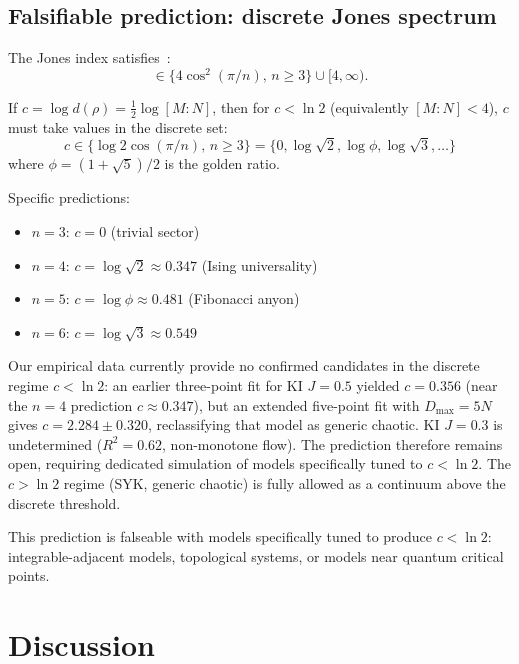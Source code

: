 \documentclass[aps,prl,twocolumn,superscriptaddress,showpacs]{revtex4-2}
\begin{document}
\subsection{Falsifiable prediction: discrete Jones spectrum}

The Jones index satisfies~\cite{Jones1983,LongoRehren1989}:
\begin{equation}
[M:N] \in \{4\cos^2(\pi/n),\, n \geq 3\} \cup [4, \infty).
\label{eq:jones_spectrum}
\end{equation}

If $c = \log d(\rho) = \frac{1}{2}\log[M:N]$, then for $c < \ln 2$
(equivalently $[M:N] < 4$), $c$ must take values in the discrete set:
\begin{equation}
c \in \{\log 2\cos(\pi/n),\, n \geq 3\}
= \{0, \log\sqrt{2}, \log\phi, \log\sqrt{3}, \ldots\}
\label{eq:discrete_prediction}
\end{equation}
where $\phi = (1+\sqrt{5})/2$ is the golden ratio.

Specific predictions:
\begin{itemize}
\item $n=3$: $c = 0$ (trivial sector)
\item $n=4$: $c = \log\sqrt{2} \approx 0.347$ (Ising universality)
\item $n=5$: $c = \log\phi \approx 0.481$ (Fibonacci anyon)
\item $n=6$: $c = \log\sqrt{3} \approx 0.549$
\end{itemize}

Our empirical data currently provide no confirmed candidates in the discrete
regime $c < \ln 2$: an earlier three-point fit for KI $J=0.5$ yielded
$c = 0.356$ (near the $n=4$ prediction $c \approx 0.347$), but an extended
five-point fit with $D_\mathrm{max} = 5N$ gives $c = 2.284 \pm 0.320$,
reclassifying that model as generic chaotic. KI $J=0.3$ is undetermined
($R^2 = 0.62$, non-monotone flow). The prediction therefore remains open,
requiring dedicated simulation of models specifically tuned to $c < \ln 2$.
The $c > \ln 2$ regime (SYK, generic chaotic) is fully allowed as a
continuum above the discrete threshold.

This prediction is falseable with models specifically tuned to produce
$c < \ln 2$: integrable-adjacent models, topological systems, or models
near quantum critical points.

\section{Discussion}
\end{document}
